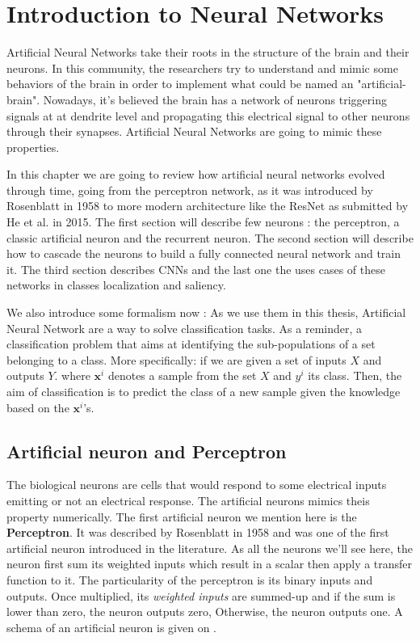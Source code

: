 \chapter{Introduction to Neural Networks}
\label{sec:neural_networks}

	Artificial Neural Networks take their roots in the structure of the brain and their neurons. In this community, the researchers try to understand and mimic some behaviors of the brain in order to implement what could be named an "artificial-brain". Nowadays, it's believed the brain has a network of neurons triggering signals at at dendrite level and propagating this electrical signal to other neurons through their synapses. Artificial Neural Networks are going to mimic these properties.

	In this chapter we are going to review how artificial neural networks evolved through time, going from the perceptron network, as it was introduced by Rosenblatt in 1958 \cite{rosenblatt1958perceptron} to more modern architecture like the ResNet as submitted by He et al. \cite{he2015deep} in 2015. The first section will describe few neurons : the perceptron, a classic artificial neuron and the recurrent neuron. The second section will describe how to cascade the neurons to build a fully connected neural network and train it. The third section describes CNNs and the last one the uses cases of these networks in classes localization and saliency.
	
	We also introduce some formalism now : As we use them in this thesis, Artificial Neural Network are a way to solve classification tasks. As a reminder, a classification problem that aims at identifying the sub-populations of a set belonging to a class. More specifically: if we are given a set of inputs $X$ and outputs $Y$. where $\boldsymbol{x}^i$ denotes a sample from the set $X$ and $y^i$ its class. Then, the aim of classification is to predict the class of a new sample given the knowledge based on the $\boldsymbol{x}^i$'s.


	\section{Artificial neuron and Perceptron}
	\label{sec:Artificial_neurons}
		The biological neurons are cells that would respond to some electrical inputs emitting or not an electrical response. The artificial neurons mimics theis property numerically. The first artificial neuron we mention here is the \textbf{Perceptron}. It was described by Rosenblatt in 1958 \cite{rosenblatt1958perceptron} and was one of the first artificial neuron introduced in the literature. As all the neurons we'll see here, the neuron first sum its weighted inputs which result in a scalar then apply a transfer function to it. The particularity of the perceptron is its binary inputs and outputs. Once multiplied, its \textit{weighted inputs} are summed-up and if the sum is lower than zero, the neuron outputs zero, Otherwise, the neuron outputs one. A schema of an artificial neuron is given on .

